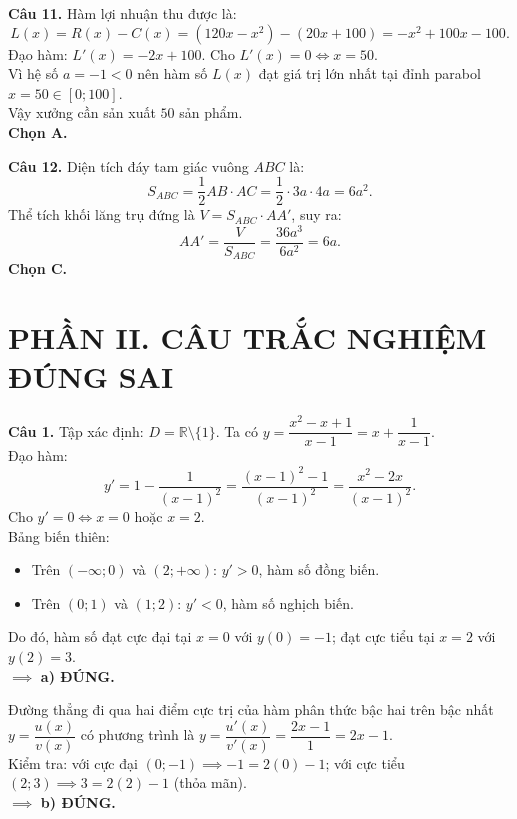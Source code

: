 \documentclass[12pt,a4paper]{article}
\begin{document}
\vspace{0.25cm}
\noindent\textbf{Câu 11.} Hàm lợi nhuận thu được là:
\[
L(x) = R(x) - C(x) = (120x - x^2) - (20x + 100) = -x^2 + 100x - 100.
\]
Đạo hàm: $L'(x) = -2x + 100$. Cho $L'(x) = 0 \iff x = 50$.\\
Vì hệ số $a = -1 < 0$ nên hàm số $L(x)$ đạt giá trị lớn nhất tại đỉnh parabol $x = 50 \in [0; 100]$.\\
Vậy xưởng cần sản xuất $50$ sản phẩm.\\
\textbf{Chọn A.}

\vspace{0.25cm}
\noindent\textbf{Câu 12.} Diện tích đáy tam giác vuông $ABC$ là:
\[
S_{ABC} = \dfrac{1}{2} AB \cdot AC = \dfrac{1}{2} \cdot 3a \cdot 4a = 6a^2.
\]
Thể tích khối lăng trụ đứng là $V = S_{ABC} \cdot AA'$, suy ra:
\[
AA' = \dfrac{V}{S_{ABC}} = \dfrac{36a^3}{6a^2} = 6a.
\]
\textbf{Chọn C.}

\vspace{0.4cm}
\section*{\large PHẦN II. CÂU TRẮC NGHIỆM ĐÚNG SAI}

\noindent\textbf{Câu 1.}
Tập xác định: $D = \mathbb{R} \setminus \{1\}$. Ta có $y = \dfrac{x^2 - x + 1}{x - 1} = x + \dfrac{1}{x - 1}$.\\
Đạo hàm:
\[
y' = 1 - \dfrac{1}{(x - 1)^2} = \dfrac{(x - 1)^2 - 1}{(x - 1)^2} = \dfrac{x^2 - 2x}{(x - 1)^2}.
\]
Cho $y' = 0 \iff x = 0$ hoặc $x = 2$.\\
Bảng biến thiên:
\begin{itemize}
    \item Trên $(-\infty; 0)$ và $(2; +\infty)$: $y' > 0$, hàm số đồng biến.
    \item Trên $(0; 1)$ và $(1; 2)$: $y' < 0$, hàm số nghịch biến.
\end{itemize}
Do đó, hàm số đạt cực đại tại $x = 0$ với $y(0) = -1$; đạt cực tiểu tại $x = 2$ với $y(2) = 3$.\\
$\implies$ \textbf{a) ĐÚNG.}

Đường thẳng đi qua hai điểm cực trị của hàm phân thức bậc hai trên bậc nhất $y = \dfrac{u(x)}{v(x)}$ có phương trình là $y = \dfrac{u'(x)}{v'(x)} = \dfrac{2x - 1}{1} = 2x - 1$.\\
Kiểm tra: với cực đại $(0; -1) \implies -1 = 2(0) - 1$; với cực tiểu $(2; 3) \implies 3 = 2(2) - 1$ (thỏa mãn).\\
$\implies$ \textbf{b) ĐÚNG.}
\end{document}
